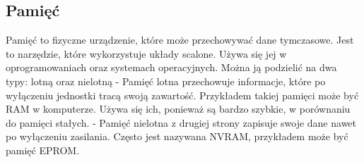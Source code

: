 \documentclass[12pt, a4paper, onside, polish]{article}				%
\begin{document}
\cleardoublepage

\subsection{Pamięć}
\hspace{\parindent}
Pamięć to fizyczne urządzenie, które może przechowywać dane tymczasowe. Jest to narzędzie, które wykorzystuje układy scalone. Używa się jej w oprogramowaniach oraz systemach operacyjnych. Można ją podzielić na dwa typy: lotną oraz nielotną \newline  \newline
- Pamięć lotna przechowuje informacje, które po wyłączeniu jednostki tracą swoją zawartość. Przykładem takiej pamięci może być RAM w komputerze. Używa się ich, ponieważ są bardzo szybkie, w porównaniu do pamięci stałych.  \newline
-  Pamięć nielotna z drugiej strony zapisuje swoje dane nawet po wyłączeniu zasilania. Często jest nazywana NVRAM, przykładem może być pamięć EPROM.  \newline

 
\end{document}
